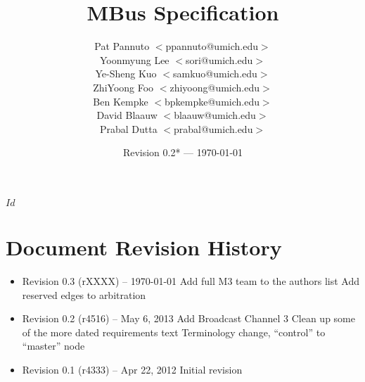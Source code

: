 \documentclass{article}
\begin{document}
\svnInfo $Id$ 

\pagestyle{fancyplain}

\title{MBus Specification}
\author{%
  Pat Pannuto $<$ppannuto@umich.edu$>$\\
  Yoonmyung Lee $<$sori@umich.edu$>$\\
  Ye-Sheng Kuo $<$samkuo@umich.edu$>$\\
  ZhiYoong Foo $<$zhiyoong@umich.edu$>$\\
  Ben Kempke $<$bpkempke@umich.edu$>$\\
  David Blaauw $<$blaauw@umich.edu$>$\\
  Prabal Dutta $<$prabal@umich.edu$>$
}
\date{Revision 0.2* --- \today}
\maketitle





\tableofcontents
\clearpage


\clearpage


\clearpage


\clearpage


\clearpage


\clearpage


\clearpage


\clearpage



\clearpage
\section{Document Revision History}
\label{sec:revisions}

\begin{itemize}

\item Revision 0.3 {\footnotesize(rXXXX)} -- \today
\subitem Add full M3 team to the authors list
\subitem Add reserved edges to arbitration

\item Revision 0.2 {\footnotesize(r4516)} -- May 6, 2013
\subitem Add Broadcast Channel 3
\subitem Clean up some of the more dated requirements text
\subitem Terminology change, ``control'' to ``master'' node

\item Revision 0.1 {\footnotesize(r4333)} -- Apr 22, 2012
\subitem Initial revision

\end{itemize}

\end{document}
